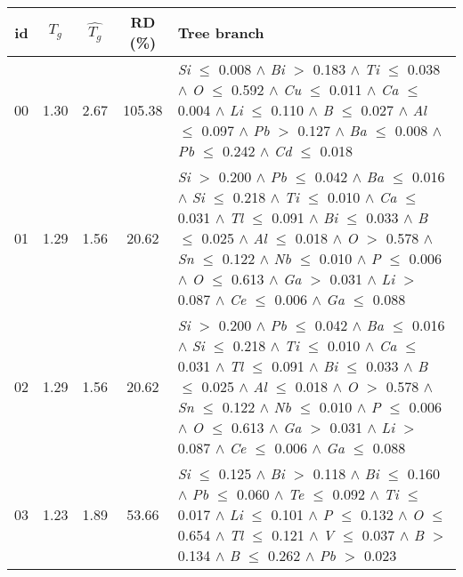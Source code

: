 \begin{table}[!htbp]
	\setlength{\tabcolsep}{3pt}
	\begin{tabular}{ccccm{}}
		\toprule
		id & $T_g$ & $\hat{T_g}$ & RD (\%) & Tree branch\\
		\midrule
		00 & 1.30 & 2.67 & 105.38 & \textit{Si} $\le$ 0.008 $\wedge$ \textit{Bi} $>$ 0.183 $\wedge$ \textit{Ti} $\le$ 0.038 $\wedge$ \textit{O} $\le$ 0.592 $\wedge$ \textit{Cu} $\le$ 0.011 $\wedge$ \textit{Ca} $\le$ 0.004 $\wedge$ \textit{Li} $\le$ 0.110 $\wedge$ \textit{B} $\le$ 0.027 $\wedge$ \textit{Al} $\le$ 0.097 $\wedge$ \textit{Pb} $>$ 0.127 $\wedge$ \textit{Ba} $\le$ 0.008 $\wedge$ \textit{Pb} $\le$ 0.242 $\wedge$ \textit{Cd} $\le$ 0.018\\
		\hline
		01 & 1.29 & 1.56 & 20.62 & \textit{Si} $>$ 0.200 $\wedge$ \textit{Pb} $\le$ 0.042 $\wedge$ \textit{Ba} $\le$ 0.016 $\wedge$ \textit{Si} $\le$ 0.218 $\wedge$ \textit{Ti} $\le$ 0.010 $\wedge$ \textit{Ca} $\le$ 0.031 $\wedge$ \textit{Tl} $\le$ 0.091 $\wedge$ \textit{Bi} $\le$ 0.033 $\wedge$ \textit{B} $\le$ 0.025 $\wedge$ \textit{Al} $\le$ 0.018 $\wedge$ \textit{O} $>$ 0.578 $\wedge$ \textit{Sn} $\le$ 0.122 $\wedge$ \textit{Nb} $\le$ 0.010 $\wedge$ \textit{P} $\le$ 0.006 $\wedge$ \textit{O} $\le$ 0.613 $\wedge$ \textit{Ga} $>$ 0.031 $\wedge$ \textit{Li} $>$ 0.087 $\wedge$ \textit{Ce} $\le$ 0.006 $\wedge$ \textit{Ga} $\le$ 0.088\\
		\hline
		02 & 1.29 & 1.56 & 20.62 & \textit{Si} $>$ 0.200 $\wedge$ \textit{Pb} $\le$ 0.042 $\wedge$ \textit{Ba} $\le$ 0.016 $\wedge$ \textit{Si} $\le$ 0.218 $\wedge$ \textit{Ti} $\le$ 0.010 $\wedge$ \textit{Ca} $\le$ 0.031 $\wedge$ \textit{Tl} $\le$ 0.091 $\wedge$ \textit{Bi} $\le$ 0.033 $\wedge$ \textit{B} $\le$ 0.025 $\wedge$ \textit{Al} $\le$ 0.018 $\wedge$ \textit{O} $>$ 0.578 $\wedge$ \textit{Sn} $\le$ 0.122 $\wedge$ \textit{Nb} $\le$ 0.010 $\wedge$ \textit{P} $\le$ 0.006 $\wedge$ \textit{O} $\le$ 0.613 $\wedge$ \textit{Ga} $>$ 0.031 $\wedge$ \textit{Li} $>$ 0.087 $\wedge$ \textit{Ce} $\le$ 0.006 $\wedge$ \textit{Ga} $\le$ 0.088\\
		\hline
		03 & 1.23 & 1.89 & 53.66 & \textit{Si} $\le$ 0.125 $\wedge$ \textit{Bi} $>$ 0.118 $\wedge$ \textit{Bi} $\le$ 0.160 $\wedge$ \textit{Pb} $\le$ 0.060 $\wedge$ \textit{Te} $\le$ 0.092 $\wedge$ \textit{Ti} $\le$ 0.017 $\wedge$ \textit{Li} $\le$ 0.101 $\wedge$ \textit{P} $\le$ 0.132 $\wedge$ \textit{O} $\le$ 0.654 $\wedge$ \textit{Tl} $\le$ 0.121 $\wedge$ \textit{V} $\le$ 0.037 $\wedge$ \textit{B} $>$ 0.134 $\wedge$ \textit{B} $\le$ 0.262 $\wedge$ \textit{Pb} $>$ 0.023\\

\end{tabular}
\end{table}
